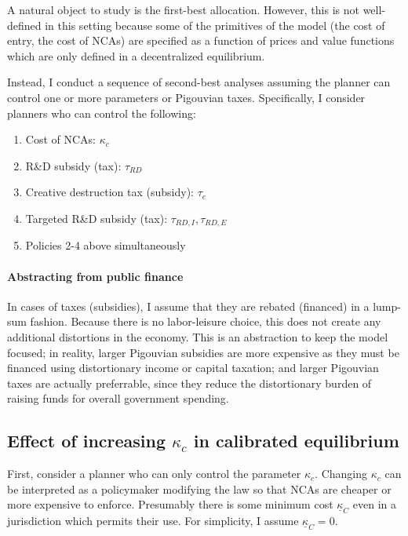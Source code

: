 \documentclass[11pt,english]{article}
\theoremstyle{remark}
\begin{document}
A natural object to study is the first-best allocation. However, this is not well-defined in this setting because some of the primitives of the model (the cost of entry, the cost of NCAs) are specified as a function of prices and value functions which are only defined in a decentralized equilibrium.

Instead, I conduct a sequence of second-best analyses assuming the planner can control one or more parameters or Pigouvian taxes. Specifically, I consider planners who can control the following: 

\begin{enumerate}
	\item Cost of NCAs: $\kappa_c$ 
	\item R\&D subsidy (tax): $\tau_{RD}$
	\item Creative destruction tax (subsidy): $\tau_e$
	\item Targeted R\&D subsidy (tax): $\tau_{RD,I}, \tau_{RD,E}$
	\item Policies 2-4 above simultaneously
\end{enumerate}

\paragraph{Abstracting from public finance} 

In cases of taxes (subsidies), I assume that they are rebated (financed) in a lump-sum fashion. Because there is no labor-leisure choice, this does not create any additional distortions in the economy. This is an abstraction to keep the model focused; in reality, larger Pigouvian subsidies are more expensive as they must be financed using distortionary income or capital taxation; and larger Pigouvian taxes are actually preferrable, since they reduce the distortionary burden of raising funds for overall government spending.

\subsection{Effect of increasing $\kappa_c$ in calibrated equilibrium} 

First, consider a planner who can only control the parameter $\kappa_c$. Changing $\kappa_c$ can be interpreted as a policymaker modifying the law so that NCAs are cheaper or more expensive to enforce. Presumably there is some minimum cost $\underline{\kappa}_C$ even in a jurisdiction which permits their use. For simplicity, I assume $\underline{\kappa}_C = 0$.
\end{document}
